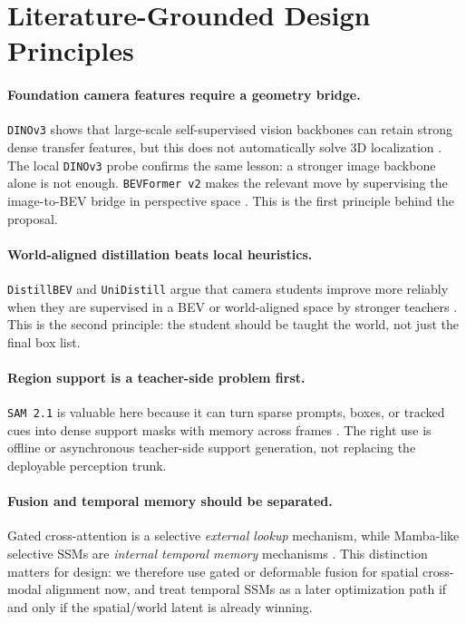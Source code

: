 \documentclass[11pt]{article}
\begin{document}
\section{Literature-Grounded Design Principles}
\paragraph{Foundation camera features require a geometry bridge.}
\texttt{DINOv3} shows that large-scale self-supervised vision backbones can retain strong dense
transfer features, but this does not automatically solve 3D localization \cite{dinov3}. The local
\texttt{DINOv3} probe confirms the same lesson: a stronger image backbone alone is not enough.
\texttt{BEVFormer v2} makes the relevant move by supervising the image-to-BEV bridge in perspective
space \cite{bevformerv2}. This is the first principle behind the proposal.

\paragraph{World-aligned distillation beats local heuristics.}
\texttt{DistillBEV} and \texttt{UniDistill} argue that camera students improve more reliably when
they are supervised in a BEV or world-aligned space by stronger teachers \cite{distillbev,unidistill}.
This is the second principle: the student should be taught the world, not just the final box list.

\paragraph{Region support is a teacher-side problem first.}
\texttt{SAM 2.1} is valuable here because it can turn sparse prompts, boxes, or tracked cues into
dense support masks with memory across frames \cite{sam2}. The right use is offline or asynchronous
teacher-side support generation, not replacing the deployable perception trunk.

\paragraph{Fusion and temporal memory should be separated.}
Gated cross-attention is a selective \emph{external lookup} mechanism, while Mamba-like selective
SSMs are \emph{internal temporal memory} mechanisms \cite{flamingo,mamba}. This distinction matters
for design: we therefore use gated or deformable fusion for spatial cross-modal alignment now,
and treat temporal SSMs as a later optimization path if and only if the spatial/world latent is
already winning.
\end{document}
